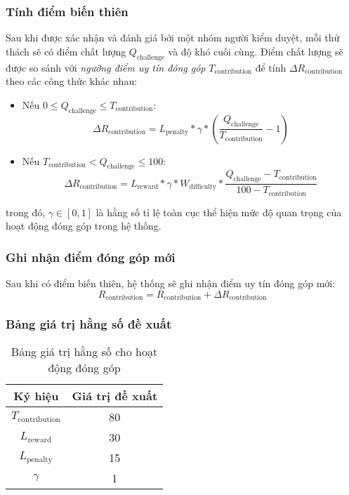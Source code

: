 \subsubsection{Tính điểm biến thiên}

Sau khi được xác nhận và đánh giá bởi một nhóm người kiểm duyệt, mỗi thử thách sẽ có điểm chất lượng $Q_{\text{challenge}}$ và độ khó cuối cùng.
Điểm chất lượng sẽ được so sánh với \textit{ngưỡng điểm uy tín đóng góp} $T_{\text{contribution}}$ để tính $\Delta R_{\text{contribution}}$ theo các công thức khác nhau:

\begin{itemize}
  \item Nếu $0 \leq Q_{\text{challenge}} \leq  T_{\text{contribution}}$:
        \[\Delta R_{\text{contribution}} = L_{\text{penalty}} * \gamma * \left( \frac{Q_{\text{challenge}}}{T_{\text{contribution}}} - 1 \right)    \]
  \item Nếu $T_{\text{contribution}} < Q_{\text{challenge}} \leq 100$:
        \[\Delta R_{\text{contribution}} = L_{\text{reward}} * \gamma * W_{\text{difficulty}} * \frac{Q_{\text{challenge}} - T_{\text{contribution}}}{100-T_{\text{contribution}}}    \]
\end{itemize}
trong đó, $\gamma \in [0, 1]$ là hằng số tỉ lệ toàn cục thể hiện mức độ quan trọng của hoạt động đóng góp trong hệ thống.

\subsubsection{Ghi nhận điểm đóng góp mới}

Sau khi có điểm biến thiên, hệ thống sẽ ghi nhận điểm uy tín đóng góp mới:
\[R_{\text{contribution}} = R_{\text{contribution}} + \Delta R_{\text{contribution}}\]

\subsubsection{Bảng giá trị hằng số đề xuất}

\begin{table}[H]
  \centering
  \small
  \begin{tabular}{|c|c|}
    \hline
    \textbf{Ký hiệu}          & \textbf{Giá trị đề xuất} \\ \hline
    $T_{\text{contribution}}$ & 80                       \\ \hline
    $L_{\text{reward}}$       & 30                       \\ \hline
    $L_{\text{penalty}}$      & 15                       \\ \hline
    $\gamma$                  & 1                        \\ \hline
  \end{tabular}
  \caption{Bảng giá trị hằng số cho hoạt động đóng góp}
  \label{tab:suggested-constant-values-for-contribution}
\end{table}

